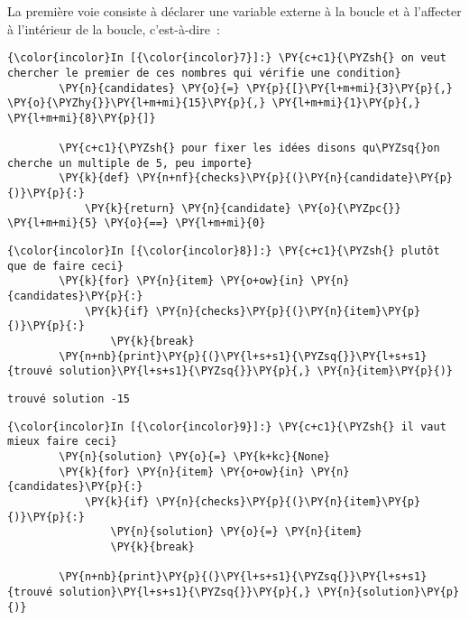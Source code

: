     La première voie consiste à déclarer une variable externe à la boucle et
à l'affecter à l'intérieur de la boucle, c'est-à-dire~:

    \begin{Verbatim}[commandchars=\\\{\}]
{\color{incolor}In [{\color{incolor}7}]:} \PY{c+c1}{\PYZsh{} on veut chercher le premier de ces nombres qui vérifie une condition}
        \PY{n}{candidates} \PY{o}{=} \PY{p}{[}\PY{l+m+mi}{3}\PY{p}{,} \PY{o}{\PYZhy{}}\PY{l+m+mi}{15}\PY{p}{,} \PY{l+m+mi}{1}\PY{p}{,} \PY{l+m+mi}{8}\PY{p}{]}
        
        \PY{c+c1}{\PYZsh{} pour fixer les idées disons qu\PYZsq{}on cherche un multiple de 5, peu importe}
        \PY{k}{def} \PY{n+nf}{checks}\PY{p}{(}\PY{n}{candidate}\PY{p}{)}\PY{p}{:}
            \PY{k}{return} \PY{n}{candidate} \PY{o}{\PYZpc{}} \PY{l+m+mi}{5} \PY{o}{==} \PY{l+m+mi}{0}
\end{Verbatim}


    \begin{Verbatim}[commandchars=\\\{\}]
{\color{incolor}In [{\color{incolor}8}]:} \PY{c+c1}{\PYZsh{} plutôt que de faire ceci}
        \PY{k}{for} \PY{n}{item} \PY{o+ow}{in} \PY{n}{candidates}\PY{p}{:}
            \PY{k}{if} \PY{n}{checks}\PY{p}{(}\PY{n}{item}\PY{p}{)}\PY{p}{:}
                \PY{k}{break}
        \PY{n+nb}{print}\PY{p}{(}\PY{l+s+s1}{\PYZsq{}}\PY{l+s+s1}{trouvé solution}\PY{l+s+s1}{\PYZsq{}}\PY{p}{,} \PY{n}{item}\PY{p}{)}
\end{Verbatim}


    \begin{Verbatim}[commandchars=\\\{\}]
trouvé solution -15

    \end{Verbatim}

    \begin{Verbatim}[commandchars=\\\{\}]
{\color{incolor}In [{\color{incolor}9}]:} \PY{c+c1}{\PYZsh{} il vaut mieux faire ceci}
        \PY{n}{solution} \PY{o}{=} \PY{k+kc}{None}
        \PY{k}{for} \PY{n}{item} \PY{o+ow}{in} \PY{n}{candidates}\PY{p}{:}
            \PY{k}{if} \PY{n}{checks}\PY{p}{(}\PY{n}{item}\PY{p}{)}\PY{p}{:}
                \PY{n}{solution} \PY{o}{=} \PY{n}{item}
                \PY{k}{break}
        
        \PY{n+nb}{print}\PY{p}{(}\PY{l+s+s1}{\PYZsq{}}\PY{l+s+s1}{trouvé solution}\PY{l+s+s1}{\PYZsq{}}\PY{p}{,} \PY{n}{solution}\PY{p}{)}
\end{Verbatim}


